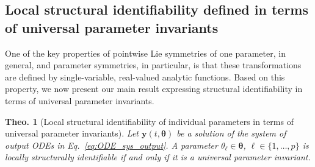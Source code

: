 \documentclass[12pt]{article}
\newtheorem{theo}{Theo.}
\begin{document}

\subsection{Local structural identifiability defined in terms of universal parameter invariants}

One of the key properties of pointwise Lie symmetries of one parameter, in general, and parameter symmetries, in particular, is that these transformations are defined by single-variable, real-valued analytic functions. Based on this property, we now present our main result expressing structural identifiability in terms of universal parameter invariants.

\begin{theo}[Local structural identifiability of individual parameters in terms of universal parameter invariants]
 Let $\mathbf{y}(t,\boldsymbol{\theta})$ be a solution of the system of output ODEs in Eq.~\eqref{eq:ODE_sys_output}. A parameter $\theta_{\ell}\in\boldsymbol{\theta}$, ${\ell}\in\{1,\ldots,p\}$ is locally structurally identifiable if and only if it is a universal parameter invariant.
\label{thm:structural identifiability_symmetries}
\end{theo}
\end{document}
